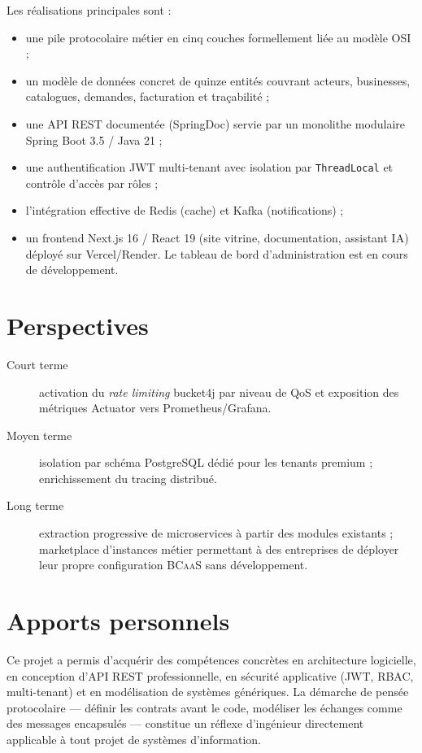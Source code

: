 \documentclass[12pt,a4paper]{report}
\theoremstyle{definition}
\theoremstyle{remark}
\newcommand{\bcaas}{\textsc{BCaaS}}
\newcommand{\api}{\textsc{API}}
\newcommand{\jwt}{\textsc{JWT}}
\newcommand{\osi}{\textsc{OSI}}
\newcommand{\rest}{\textsc{REST}}
\begin{document}
Les réalisations principales sont :
\begin{itemize}
	\item une pile protocolaire métier en cinq couches formellement liée au modèle \osi{} ;
	\item un modèle de données concret de quinze entités couvrant acteurs, businesses, catalogues, demandes, facturation et traçabilité ;
	\item une \api{} \rest{} documentée (SpringDoc) servie par un monolithe modulaire Spring Boot 3.5 / Java 21 ;
	\item une authentification \jwt{} multi-tenant avec isolation par \texttt{ThreadLocal} et contrôle d'accès par rôles ;
	\item l'intégration effective de Redis (cache) et Kafka (notifications) ;
	\item un frontend Next.js 16 / React 19 (site vitrine, documentation, assistant IA) déployé sur Vercel/Render. Le tableau de bord d'administration est en cours de développement.
\end{itemize}

\section{Perspectives}

\begin{description}
	\item[Court terme] activation du \textit{rate limiting} bucket4j par niveau de QoS et exposition des métriques Actuator vers Prometheus/Grafana.
	\item[Moyen terme] isolation par schéma PostgreSQL dédié pour les tenants premium ; enrichissement du tracing distribué.
	\item[Long terme] extraction progressive de microservices à partir des modules existants ; marketplace d'instances métier permettant à des entreprises de déployer leur propre configuration \bcaas{} sans développement.
\end{description}

\section{Apports personnels}

Ce projet a permis d'acquérir des compétences concrètes en architecture logicielle, en conception d'\api{} \rest{} professionnelle, en sécurité applicative (\jwt, RBAC, multi-tenant) et en modélisation de systèmes génériques. La démarche de pensée protocolaire — définir les contrats avant le code, modéliser les échanges comme des messages encapsulés — constitue un réflexe d'ingénieur directement applicable à tout projet de systèmes d'information.
\end{document}
